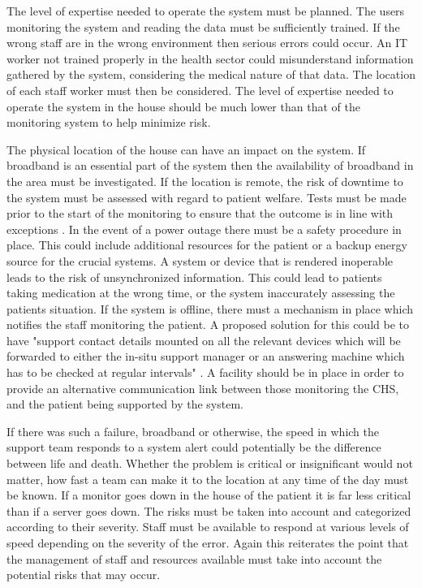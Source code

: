 The level of expertise needed to operate the system must be planned. The users monitoring the system and reading the data must be sufficiently trained. If the wrong staff are in the wrong environment then serious errors could occur. An IT worker not trained properly in the health sector could misunderstand information gathered by the system, considering the medical nature of that data. The location of each staff worker must then be considered. The level of expertise needed to operate the system in the house should be much lower than that of the monitoring system to help minimize risk.

The physical location of the house can have an impact on the system. If broadband is an essential part of the system then the availability of broadband in the area must be investigated. If the location is remote, the risk of downtime to the system must be assessed with regard to patient welfare. Tests must be made prior to the start of the monitoring to ensure that the outcome is in line with exceptions \parencite{env}. In the event of a power outage there must be a safety procedure in place. This could include additional resources for the patient or a backup energy source for the crucial systems. A system or device that is rendered inoperable leads to the risk of unsynchronized information. This could lead to patients taking medication at the wrong time, or the system inaccurately assessing the patients situation. If the system is offline, there must a mechanism in place which notifies the staff monitoring the patient. A proposed solution for this could be to have "support contact details mounted on all the relevant devices which will be forwarded to either the in-situ support manager or an answering machine which has to be checked at regular intervals" \parencite{env}. A facility should be in place in order to provide an alternative communication link between those monitoring the CHS, and the patient being supported by the system. 

If there was such a failure, broadband or otherwise, the speed in which the support team responds to a system alert could potentially be the difference between life and death. Whether the problem is critical or insignificant would not matter, how fast a team can make it to the location at any time of the day must be known. If a monitor goes down in the house of the patient it is far less critical than if a server goes down. The risks must be taken into account and categorized according to their severity. Staff must be available to respond at various levels of speed depending on the severity of the error. Again this reiterates the point that the management of staff and resources available must take into account the potential risks that may occur. 

